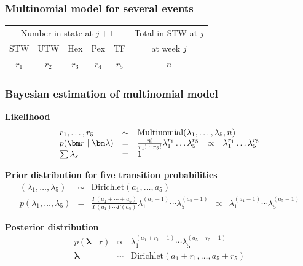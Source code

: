 
\begin{frame}

\frametitle{Multinomial model for several events}

\begin{center}

\end{center}


\begin{center}
\begin{tabular}{ccccc|c} \\ \hline
\multicolumn{5}{c|}{Number in state at $j+1$}&Total in STW at $j$ \\
STW&UTW&Hex&Pex&TF&at week $j$ \\ \hline
$r_1$ & $r_2$ & $r_3$ & $r_4$ &  $r_5$ & $n$ \\ \hline
\end{tabular}
\end{center}


\end{frame}


\begin{frame}

\frametitle{Bayesian estimation of multinomial model}

\textbf{Likelihood}
\myblue
\[
\begin{array}{lllll}
r_1, \ldots, r_5  &\sim &\multicolumn{3}{l}{\mbox{Multinomial} (\lambda_1, \ldots, \lambda_5,n)} \\
p(\bm r\mid\bm\lambda) &=& \frac{n!}{r_1! \cdots r_5!}\lambda_1^{r_1} \ldots \lambda_5^{r_5} &\propto& \lambda_1^{r_1} \ldots \lambda_5^{r_5} \\
\sum \lambda_s &=& 1
\end{array}
\]

\black  
\textbf{Prior distribution for five transition probabilities}
\myblue
\[
\begin{array}{lllll}
(\lambda_1,\ldots,\lambda_5) &\sim &\mbox{Dirichlet} (a_1,\ldots,a_5)&&  \\
p(\lambda_1,\ldots,\lambda_5) &=& \frac{\Gamma(a_1+\cdots+a_5)}{\Gamma(a_1)\cdots\Gamma(a_5)}\lambda_1^{(a_1-1)}\cdots\lambda_5^{(a_5-1)} &\propto& \lambda_1^{(a_1-1)}\cdots\lambda_5^{(a_5-1)} 
\end{array}
\] 

\black  
\textbf{Posterior distribution}
\myblue
\begin{eqnarray}
p(\bm\lambda\mid \bm r) &\propto& \lambda_1^{(a_1+r_1-1)}\cdots\lambda_5^{(a_5+r_5-1)} \nonumber \\
\bm\lambda &\sim & \mbox{Dirichlet} (a_1+r_1,\ldots, a_5+r_5)\nonumber 
\end{eqnarray}

\end{frame}


